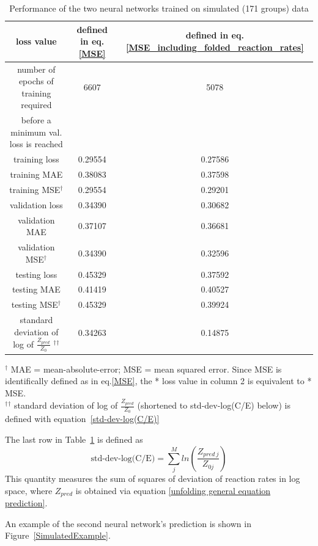 \documentclass[a4paper, 12pt]{article}
\begin{document}
    \begin{table}
    \begin{tabular}{ccc}
    loss value & defined in eq. \ref{MSE} & defined in eq. \ref{MSE_including_folded_reaction_rates}\\
    \hline
    number of epochs of training required & 6607 & 5078 \\
    before a minimum val. loss is reached\\
    training loss & 0.29554 & 0.27586 \\
    training MAE & 0.38083 & 0.37598 \\
    training MSE${}^\dagger$ & 0.29554 & 0.29201 \\
    validation loss & 0.34390 & 0.30682 \\
    validation MAE & 0.37107 & 0.36681 \\
    validation MSE${}^\dagger$ & 0.34390 & 0.32596 \\
    testing loss & 0.45329 & 0.37592 \\
    testing MAE & 0.41419 & 0.40527 \\
    testing MSE${}^\dagger$ & 0.45329 & 0.39924 \\
    standard deviation of log of $\frac{Z_{pred}}{Z_{0}}$ ${}^\dagger$${}^\dagger$ & 0.34263 & 0.14875\\
    \end{tabular}
    \caption{Performance of the two neural networks trained on simulated (171 groups) data}\label{SimulatedLoss}
    ${}^\dagger$ MAE = mean-absolute-error; MSE = mean squared error. Since MSE is identifically defined as in eq.\ref{MSE}, the * loss value in column 2 is equivalent to * MSE.\\
    ${}^\dagger$${}^\dagger$ standard deviation of log of $\frac{Z_{pred}}{Z_{0}}$ (shortened to std-dev-log(C/E) below) is defined with equation~\ref{std-dev-log(C/E)}
    \end{table}

    The last row in Table~\ref{SimulatedLoss} is defined as
    \begin{equation}\label{std-dev-log(C/E)}
        \text{std-dev-log(C/E)} = \sum_j^M ln\left(\frac{Z_{pred\:j}}{Z_{0j}}\right)
    \end{equation}
    This quantity measures the sum of squares of deviation of reaction rates in log space,
    where $Z_{pred}$ is obtained via equation \ref{unfolding general equation prediction}.

    An example of the second neural network's prediction is shown in Figure~\ref{SimulatedExample}.
\end{document}
